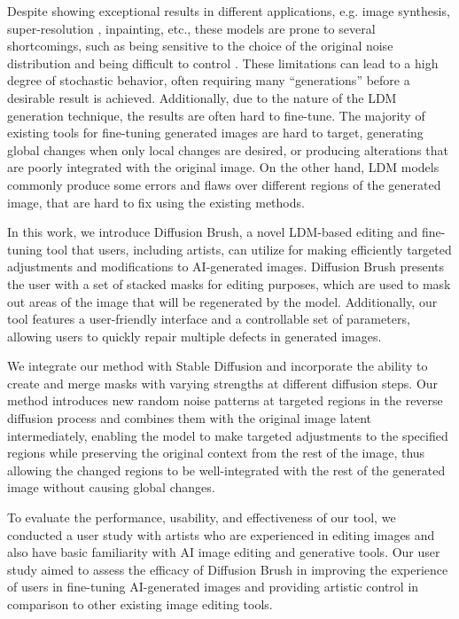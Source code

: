 \documentclass[10pt,twocolumn,letterpaper]{article}
\begin{document}
Despite showing exceptional results in different applications, e.g. image synthesis, super-resolution \cite{saharia2022image}, inpainting, etc., these models are prone to several shortcomings, such as being sensitive to the choice of the original noise distribution and being difficult to control \cite{wang2020state}. These limitations can lead to a high degree of stochastic behavior, often requiring many ``generations'' before a desirable result is achieved. Additionally, due to the nature of the LDM generation technique, the results are often hard to fine-tune. The majority of existing tools for fine-tuning generated images are hard to target, generating global changes when only local changes are desired, or producing alterations that are poorly integrated with the original image. On the other hand, LDM models commonly produce some errors and flaws over different regions of the generated image, that are hard to fix using the existing methods.

In this work, we introduce Diffusion Brush, a novel LDM-based editing and fine-tuning tool that users, including artists, can utilize for making efficiently targeted adjustments and modifications to AI-generated images. Diffusion Brush presents the user with a set of stacked masks for editing purposes, which are used to mask out areas of the image that will be regenerated by the model. Additionally, our tool features a user-friendly interface and a controllable set of parameters, allowing users to quickly repair multiple defects in generated images.

We integrate our method with Stable Diffusion \cite{rombach2022high} and incorporate the ability to create and merge masks with varying strengths at different diffusion steps. Our method introduces new random noise patterns at targeted regions in the reverse diffusion process and combines them with the original image latent intermediately, enabling the model to make targeted adjustments to the specified regions while preserving the original context from the rest of the image, thus allowing the changed regions to be well-integrated with the rest of the generated image without causing global changes.

To evaluate the performance, usability, and effectiveness of our tool, we conducted a user study with artists who are experienced in editing images and also have basic familiarity with AI image editing and generative tools. Our user study aimed to assess the efficacy of Diffusion Brush in improving the experience of users in fine-tuning AI-generated images and providing artistic control in comparison to other existing image editing tools.
\end{document}
